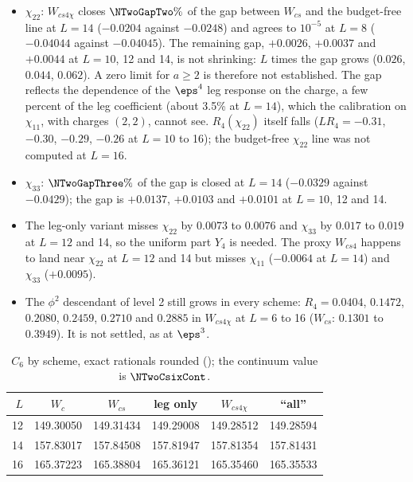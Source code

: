 \begin{itemize}
\item $\chi_{22}$: $W_{cs4\chi}$ closes $\NTwoGapTwo\%$ of the gap between $W_{cs}$ and the budget-free line at $L=14$ ($-0.0204$
 against $-0.0248$) and agrees to $10^{-5}$ at $L=8$ ($-0.04044$ against $-0.04045$). The remaining gap, $+0.0026$, $+0.0037$ and $+0.0044$ at $L=10$, 12 and 14,
 is not shrinking: $L$ times the gap grows ($0.026$, $0.044$, $0.062$). A zero limit for $a\ge2$ is therefore not established.
 The gap reflects the dependence of the $\eps^4$ leg response on the charge, a few percent of the leg coefficient
 (about 3.5\% at $L=14$), which the calibration on $\chi_{11}$, with charges $(2,2)$, cannot see. $R_4(\chi_{22})$ itself falls ($LR_4=-0.31$, $-0.30$, $-0.29$, $-0.26$ at $L=10$ to 16); the budget-free
 $\chi_{22}$ line was not computed at $L=16$.
\item $\chi_{33}$: $\NTwoGapThree\%$ of the gap is closed at $L=14$ ($-0.0329$ against $-0.0429$); the gap is $+0.0137$, $+0.0103$
 and $+0.0101$ at $L=10$, 12 and 14.
\item The leg-only variant misses $\chi_{22}$ by $0.0073$ to $0.0076$ and $\chi_{33}$ by $0.017$ to $0.019$ at $L=12$ and 14, so the uniform
 part $Y_4$ is needed. The proxy $W_{cs4}$ happens to land near $\chi_{22}$ at $L=12$ and 14 but misses $\chi_{11}$ ($-0.0064$ at
 $L=14$) and $\chi_{33}$ ($+0.0095$).
\item The $\phi^2$ descendant of level 2 still grows in every scheme: $R_4=0.0404$, $0.1472$, $0.2080$, $0.2459$, $0.2710$ and
 $0.2885$ in $W_{cs4\chi}$ at $L=6$ to 16 ($W_{cs}$: $0.1301$ to $0.3949$). It is not settled, as at $\eps^3$.
\end{itemize}

\begin{table}[ht]
\centering\footnotesize\renewcommand{\arraystretch}{1.15}
\begin{tabular}{@{}rccccc@{}}
\toprule
$L$ & $W_c$ & $W_{cs}$ & leg only & $W_{cs4\chi}$ & ``all'' \\\midrule
12 & 149.30050 & 149.31434 & 149.29008 & 149.28512 & 149.28594 \\
14 & 157.83017 & 157.84508 & 157.81947 & 157.81354 & 157.81431 \\
16 & 165.37223 & 165.38804 & 165.36121 & 165.35460 & 165.35533 \\
\bottomrule
\end{tabular}
\caption{$C_6$ by scheme, exact rationals rounded (); the continuum
value is $\NTwoCsixCont$.}
\label{d2:tab:c6}
\end{table}

